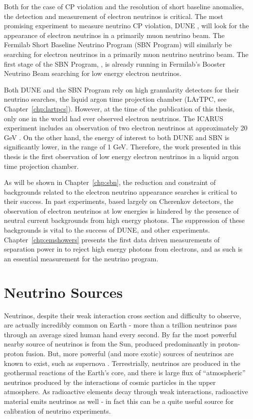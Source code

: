 Both for the case of CP violation and the resolution of short baseline anomalies, the detection and measurement of electron neutrinos is critical.  The most promising experiment to measure neutrino CP violation, DUNE \cite{Acciarri:2016ooe}, will look for the appearance of electron neutrinos in a primarily muon neutrino beam.  The Fermilab Short Baseline Neutrino Program (SBN Program) \cite{Antonello:2015lea} will similarly be searching for electron neutrinos in a primarily muon neutrino neutrino beam.  The first stage of the SBN Program, \uboone, is already running in Fermilab's Booster Neutrino Beam searching for low energy electron neutrinos.

Both DUNE and the SBN Program rely on high granularity detectors for their neutrino searches, the liquid argon time projection chamber (LArTPC, see Chapter~\ref{chp:lartpcs}).  However, at the time of the publication of this thesis, only one \lartpc in the world had ever observed electron neutrinos.  The ICARUS experiment includes an observation of two electron neutrinos at approximately 20 GeV \cite{Antonello:2013gut}.  On the other hand, the energy of interest to both DUNE and SBN is significantly lower, in the range of 1 GeV.  Therefore, the work presented in this thesis is the first observation of low energy electron neutrinos in a liquid argon time projection chamber.   

As will be shown in Chapter~\ref{chp:sbn}, the reduction and constraint of backgrounds related to the electron neutrino appearance searches is critical to their success.  In past experiments, based largely on Cherenkov detectors, the observation of electron neutrinos at low energies is hindered by the presence of neutral current backgrounds from high energy photons.  The suppression of these backgrounds is vital to the success of DUNE, \uboone and other \lartpc experiments.  Chapter~\ref{chp:emshowers} presents the first data driven measurements of separation power in \lartpcs to reject high energy photons from electrons, and as such is an essential measurement for the \lartpc neutrino program.

\section{Neutrino Sources}

Neutrinos, despite their weak interaction cross section and difficulty to observe, are actually incredibly common on Earth - more than a trillion neutrinos pass through an average sized human hand every second.  By far the most powerful nearby source of neutrinos is from the Sun, produced predominantly in proton-proton fusion.  But, more powerful (and more exotic) sources of neutrinos are known to exist, such as supernova \cite{Dadykin:1987ek, Hirata:1988ad}.  Terrestrially, neutrinos are produced in the geothermal reactions of the Earth's core, and there is large flux of ``atmospheric'' neutrinos produced by the interactions of cosmic particles in the upper atmosphere.  As radioactive elements decay through weak interactions, radioactive material emits neutrinos as well - in fact this can be a quite useful source for calibration of neutrino experiments.

